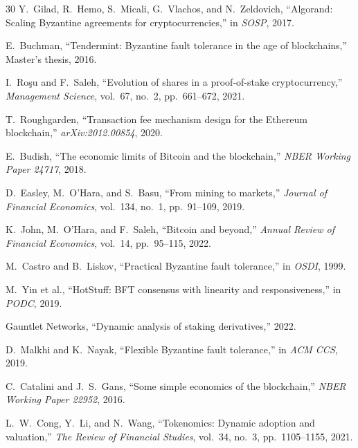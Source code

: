 \documentclass[11pt,a4paper]{article}
\begin{document}
\begin{thebibliography}{30}
Y.~Gilad, R.~Hemo, S.~Micali, G.~Vlachos, and N.~Zeldovich, ``Algorand: Scaling Byzantine agreements for cryptocurrencies,'' in \emph{SOSP}, 2017.

E.~Buchman, ``Tendermint: Byzantine fault tolerance in the age of blockchains,'' Master's thesis, 2016.

I.~Ro\c{s}u and F.~Saleh, ``Evolution of shares in a proof-of-stake cryptocurrency,'' \emph{Management Science}, vol.~67, no.~2, pp.~661--672, 2021.

T.~Roughgarden, ``Transaction fee mechanism design for the Ethereum blockchain,'' \emph{arXiv:2012.00854}, 2020.

E.~Budish, ``The economic limits of Bitcoin and the blockchain,'' \emph{NBER Working Paper 24717}, 2018.

D.~Easley, M.~O'Hara, and S.~Basu, ``From mining to markets,'' \emph{Journal of Financial Economics}, vol.~134, no.~1, pp.~91--109, 2019.

K.~John, M.~O'Hara, and F.~Saleh, ``Bitcoin and beyond,'' \emph{Annual Review of Financial Economics}, vol.~14, pp.~95--115, 2022.

M.~Castro and B.~Liskov, ``Practical Byzantine fault tolerance,'' in \emph{OSDI}, 1999.

M.~Yin et al., ``HotStuff: BFT consensus with linearity and responsiveness,'' in \emph{PODC}, 2019.

Gauntlet Networks, ``Dynamic analysis of staking derivatives,'' 2022.

D.~Malkhi and K.~Nayak, ``Flexible Byzantine fault tolerance,'' in \emph{ACM CCS}, 2019.

C.~Catalini and J.~S.~Gans, ``Some simple economics of the blockchain,'' \emph{NBER Working Paper 22952}, 2016.

L.~W.~Cong, Y.~Li, and N.~Wang, ``Tokenomics: Dynamic adoption and valuation,'' \emph{The Review of Financial Studies}, vol.~34, no.~3, pp.~1105--1155, 2021.

\end{thebibliography}
\end{document}
